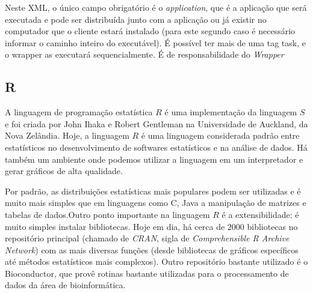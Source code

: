 Neste XML, o único campo obrigatório é o \emph{application}, que é a aplicação
que será executada e pode ser distribuída junto com a aplicação ou já existir no 
computador que o cliente estará instalado (para este segundo caso é necessário
informar o caminho inteiro do executável). É possível ter mais de uma tag
task, e o wrapper as executará sequencialmente. É de responsabilidade
do \textit{Wrapper} 

\subsection{R}

A linguagem de programação estatística $R$ é uma implementação da linguagem $S$ e foi criada por John Ihaka e Robert
Gentleman na Universidade de Auckland, da Nova Zelândia. Hoje, a linguagem $R$ é uma linguagem considerada padrão
entre estatísticos no desenvolvimento de softwares estatísticos e na análise de dados. Há também um ambiente 
onde podemos utilizar a linguagem em um interpretador e gerar gráficos de alta qualidade. 

Por padrão, as distribuições estatísticas mais populares podem ser utilizadas e é muito mais simples que em 
linguagens como C, Java a manipulação de matrizes e tabelas de dados.Outro ponto importante na linguagem $R$ 
é a extensibilidade: é muito simples instalar bibliotecas. Hoje em dia, há
cerca de $2000$ bibliotecas no repositório principal (chamado de \emph{CRAN}, 
sigla de \textit{Comprehensible R Archive Network}) com as mais diversas funções 
(desde bibliotecas de gráficos específicos até métodos estatísticos mais complexos). 
Outro repositório bastante utilizado é o Bioconductor, que provê rotinas bastante utilizadas para o processamento
de dados da área de bioinformática.





